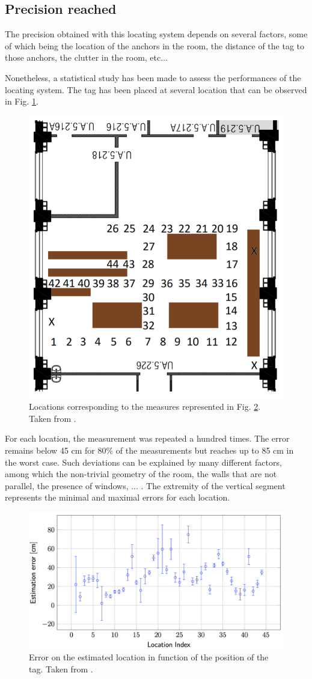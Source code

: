 \subsection{Precision reached}

The precision obtained with this locating system depends on several factors, some of which being the location of the anchors in the room, the distance of the tag to those anchors, the clutter in the room, etc...
\vspace{2mm}

Nonetheless, a statistical study has been made to assess the performances of the locating system. The tag has been placed at several location that can be observed in Fig. \ref{fig:test_map}.

\begin{figure}[H]
	\centering
	\includegraphics[width=.35\linewidth]{Images/test_map.png}
	\caption{Locations corresponding to the measures represented in Fig. \ref{fig:test_result}. Taken from \cite{hannotier2019indoor}.}
	\label{fig:test_map}
\end{figure}

For each location, the measurement was repeated a hundred times. The error remains below 45 cm for 80\% of the measurements but reaches up to 85 cm in the worst case. Such deviations can be explained by many different factors, among which the non-trivial geometry of the room, the walls that are not parallel, the presence of windows, ... \cite{hannotier2019indoor}. The extremity of the vertical segment represents the minimal and maximal errors for each location.
\vspace{2mm}

\begin{figure}[H]
	\centering
	\includegraphics[width=.8\linewidth]{Images/test_fig.png}
	\caption{Error on the estimated location in function of the position of the tag. Taken from \cite{hannotier2019indoor}.}
	\label{fig:test_result}
\end{figure}

